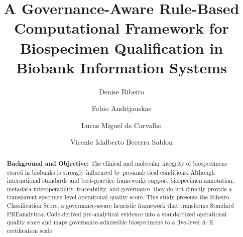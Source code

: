 \documentclass[preprint,12pt]{elsarticle}
\begin{document}
\begin{frontmatter}

\title{A Governance-Aware Rule-Based Computational Framework for Biospecimen Qualification in Biobank Information Systems}

\author[inst1]{Denise Ribeiro}
\author[inst1,inst2]{Fabio Andrijauskas}
\author[inst1]{Lucas Miguel de Carvalho}
\author[inst1]{Vicente Idalberto Becerra Sablon}




\begin{abstract}
\textbf{Background and Objective:} The clinical and molecular integrity of biospecimens stored in biobanks is strongly influenced by 
pre-analytical conditions. Although international standards and best-practice frameworks support biospecimen annotation, metadata 
interoperability, traceability, and governance, they do not directly provide a transparent specimen-level operational quality score. This study 
presents the Ribeiro Classification Score, a governance-aware heuristic framework that transforms Standard PREanalytical Code-derived 
pre-analytical evidence into a standardized operational quality score and maps governance-admissible biospecimens to a five-level A--E 
certification scale.


\end{abstract}
\end{frontmatter}
\end{document}
